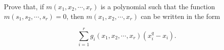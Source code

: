Prove that, if $m(x_1, x_2, \cdots, x_r)$ is a polynomial such that the function $m(s_1, s_2, \cdots, s_r) = 0$, then $m(x_1, x_2, \cdots, x_r)$ can be written in the form

$$\sum_{i=1}^{r} g_i(x_1, x_2, \cdots, x_r)(x_i^q - x_i).$$